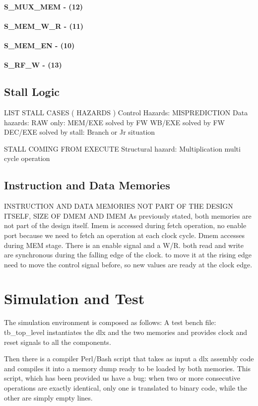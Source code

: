 \documentclass[12pt]{article}
\begin{document}
\paragraph{S\_MUX\_MEM - (12)}
\paragraph{S\_MEM\_W\_R - (11)}
\paragraph{S\_MEM\_EN - (10)}
\paragraph{S\_RF\_W - (13)}

\subsection{Stall Logic}
LIST STALL CASES ( HAZARDS )
Control Hazards: MISPREDICTION
Data hazards: RAW only:
MEM/EXE solved by FW
WB/EXE solved by FW
DEC/EXE solved by stall: Branch or Jr situation

STALL COMING FROM EXECUTE
Structural hazard: Multiplication multi cycle operation

\subsection{Instruction and Data Memories}
INSTRUCTION AND DATA MEMORIES NOT PART OF THE DESIGN ITSELF, SIZE OF DMEM AND IMEM
As previously stated, both memories are not part of the design itself.
Imem is accessed during fetch operation, no enable port because we need to fetch an operation at each clock cycle.
Dmem accesses during MEM stage. There is an enable signal and a W/R. both read and write are synchronous during the falling edge of the clock. to move it at the rising edge need to move the control signal before, so new values are ready at the clock edge.


\section{Simulation and Test}\label{Conclusions}
The simulation environment is composed as follows:
A test bench file: tb\_top\_level instantiates the dlx and the two memories and provides clock and reset signals to all the components.

Then there is a compiler Perl/Bash script that takes as input a dlx assembly code and compiles it into a memory dump ready to be loaded by both memories.
This script, which has been provided us have a bug: when two or more consecutive operations are exactly identical, only one is translated to binary code, while the other are simply empty lines.
\end{document}
